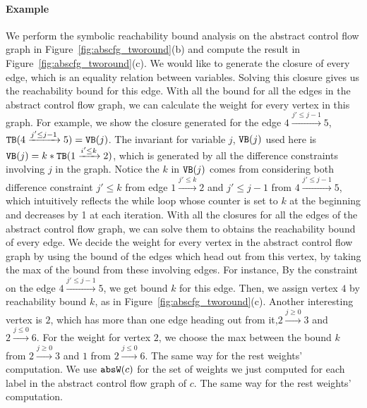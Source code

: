 \begin{enumerate}
\paragraph*{Example}
We perform the symbolic reachability bound analysis on the abstract control flow graph in Figure~\ref{fig:abscfg_tworound}(b) and compute the result in Figure~\ref{fig:abscfg_tworound}(c).
We would like to generate the closure of every edge, which is an equality relation between variables.  Solving this closure gives us the reachability bound for this edge. With all the bound for all the edges in the abstract control flow graph, we can calculate the weight for every vertex in this graph. For example, we show the closure generated for the edge 
$4 \xrightarrow{j' \leq j - 1} 5$, 
${\mathtt{TB}}(4 \xrightarrow{j' \leq j - 1} 5) = {\mathtt{VB}}(j)$. The invariant for variable $j$, ${\mathtt{VB}}(j)$ used here is 
${\mathtt{VB}}(j) = k * {\mathtt{TB}}(1 \xrightarrow{i' \leq k} 2)$, 
which is generated by all the difference constraints involving $j$ in the graph.
Notice the $k$ in ${\mathtt{VB}}(j)$ comes from considering both difference constraint $j' \leq k$ from edge
$1 \xrightarrow{j' \leq k} 2$ and $j'\leq j - 1$ from $4 \xrightarrow{j' \leq j - 1} 5$, which intuitively reflects the while loop whose counter is set to $k$ at the beginning and decreases by 1 at each iteration. 
With all the closures for all the edges of the abstract control flow graph, we can solve them to obtains the reachability bound of every edge. We decide the weight for every vertex in the abstract control flow graph by using the bound of the edges which head out from this vertex, by taking the max of the bound from these involving edges. For instance,   
By the constraint on the edge $4 \xrightarrow{j' \leq j - 1} 5$, we get bound $k$ for this edge.
Then, we assign vertex $4$ by reachability bound $k$, as in Figure~\ref{fig:abscfg_tworound}(c). 
Another interesting vertex is $2$, which has more than one edge heading out from it,$2 \xrightarrow{j \geq 0} 3$ and 
$2 \xrightarrow{j \leq 0} 6$. For the weight for vertex $2$, 
we choose the max between the bound $k$ from $2 \xrightarrow{j \geq 0} 3$ and $1$ from $2 \xrightarrow{j \leq 0} 6$.
The same way for the rest weights' computation.
We use $\mathtt{abs}{\mathtt{W}}(c)$ for the set of weights we just computed 
for each label in the abstract control flow graph of $c$.
%
The same way for the rest weights' computation.
\end{enumerate}

